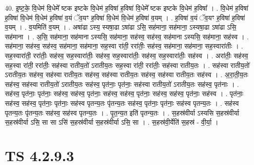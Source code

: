 \documentclass[17pt]{extarticle}
\begin{document}
40. इ॒ष्ट॒के॒ वि॒धेम॑ वि॒धेमे᳚ ष्टक इष्टके वि॒धेम॑ ह॒विषा॑ ह॒विषा॑ वि॒धेमे᳚ ष्टक इष्टके वि॒धेम॑ ह॒विषा᳚ । . वि॒धेम॑ ह॒विषा॑ ह॒विषा॑ वि॒धेम॑ वि॒धेम॑ ह॒विषा॑ व॒यं ॅव॒यꣳ ह॒विषा॑ वि॒धेम॑ वि॒धेम॑ ह॒विषा॑ व॒यम् । . ह॒विषा॑ व॒यं ॅव॒यꣳ ह॒विषा॑ ह॒विषा॑ व॒यम् । . व॒यमिति॑ व॒यम् । . अषा॑ढा ऽस्य॒ स्यषा॒ढा ऽषा॑ढा ऽसि॒ सह॑माना॒ सह॑माना॒ ऽस्यषा॒ढा ऽषा॑ढा ऽसि॒ सह॑माना । . अ॒सि॒ सह॑माना॒ सह॑माना ऽस्यसि॒ सह॑माना॒ सह॑स्व॒ सह॑स्व॒ सह॑माना ऽस्यसि॒ सह॑माना॒ सह॑स्व । . सह॑माना॒ सह॑स्व॒ सह॑स्व॒ सह॑माना॒ सह॑माना॒ सह॒स्वा रा॑ती॒ ररा॑तीः॒ सह॑स्व॒ सह॑माना॒ सह॑माना॒ सह॒स्वारा॑तीः । . सह॒स्वारा॑ती॒ ररा॑तीः॒ सह॑स्व॒ सह॒स्वारा॑तीः॒ सह॑स्व॒ सह॒स्वारा॑तीः॒ सह॑स्व॒ सह॒स्वारा॑तीः॒ सह॑स्व । . अरा॑तीः॒ सह॑स्व॒ सह॒स्वा रा॑ती॒ ररा॑तीः॒ सह॑स्वा रातीय॒तो॑ ऽरातीय॒तः सह॒स्वा रा॑ती॒ ररा॑तीः॒ सह॑स्वा रातीय॒तः । . सह॑स्वा रातीय॒तो॑ ऽरातीय॒तः सह॑स्व॒ सह॑स्वा रातीय॒तः सह॑स्व॒ सह॑स्वा रातीय॒तः सह॑स्व॒ सह॑स्वा रातीय॒तः सह॑स्व । . अ॒रा॒ती॒य॒तः सह॑स्व॒ सह॑स्वा रातीय॒तो॑ ऽरातीय॒तः सह॑स्व॒ पृत॑नाः॒ पृत॑नाः॒ सह॑स्वा रातीय॒तो॑ ऽरातीय॒तः सह॑स्व॒ पृत॑नाः । . सह॑स्व॒ पृत॑नाः॒ पृत॑नाः॒ सह॑स्व॒ सह॑स्व॒ पृत॑नाः॒ सह॑स्व॒ सह॑स्व॒ पृत॑नाः॒ सह॑स्व॒ सह॑स्व॒ पृत॑नाः॒ सह॑स्व । . पृत॑नाः॒ सह॑स्व॒ सह॑स्व॒ पृत॑नाः॒ पृत॑नाः॒ सह॑स्व पृतन्य॒तः पृ॑तन्य॒तः सह॑स्व॒ पृत॑नाः॒ पृत॑नाः॒ सह॑स्व पृतन्य॒तः । . सह॑स्व पृतन्य॒तः पृ॑तन्य॒तः सह॑स्व॒ सह॑स्व पृतन्य॒तः । . पृ॒त॒न्य॒त इति॑ पृतन्य॒तः । . स॒हस्र॑वीर्या ऽस्यसि स॒हस्र॑वीर्या स॒हस्र॑वीर्या ऽसि॒ सा सा ऽसि॑ स॒हस्र॑वीर्या स॒हस्र॑वीर्या ऽसि॒ सा । . स॒हस्र॑वी॒र्येति॑ स॒हस्र॑ - वी॒र्या॒ । \newline
\pagebreak
{}

\section{ TS 4.2.9.3 }
\end{document}
